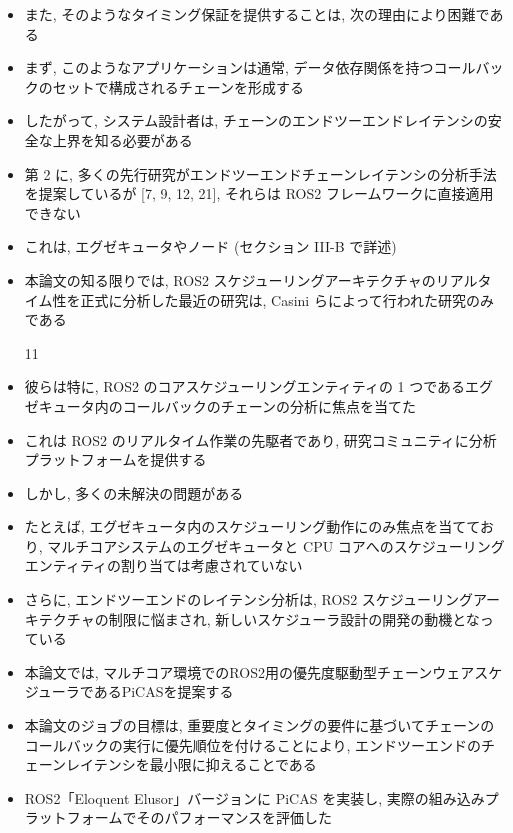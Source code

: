 \begin{frame}{}
    \begin{itemize}
        \item また, そのようなタイミング保証を提供することは, 次の理由により困難である
\item まず, このようなアプリケーションは通常, データ依存関係を持つコールバックのセットで構成されるチェーンを形成する
\item したがって, システム設計者は, チェーンのエンドツーエンドレイテンシの安全な上界を知る必要がある
\item 第 2 に, 多くの先行研究がエンドツーエンドチェーンレイテンシの分析手法を提案しているが [7, 9, 12, 21], それらは ROS2 フレームワークに直接適用できない
\item これは, エグゼキュータやノード (セクション III-B で詳述)
    \end{itemize}
\end{frame}

\begin{frame}{}
    \begin{itemize}
        \item 本論文の知る限りでは, ROS2 スケジューリングアーキテクチャのリアルタイム性を正式に分析した最近の研究は, Casini らによって行われた研究のみである
\item [11]
\item 彼らは特に, ROS2 のコアスケジューリングエンティティの 1 つであるエグゼキュータ内のコールバックのチェーンの分析に焦点を当てた
\item これは ROS2 のリアルタイム作業の先駆者であり, 研究コミュニティに分析プラットフォームを提供する
\item しかし, 多くの未解決の問題がある
\item たとえば, エグゼキュータ内のスケジューリング動作にのみ焦点を当てており, マルチコアシステムのエグゼキュータと CPU コアへのスケジューリングエンティティの割り当ては考慮されていない
\item さらに, エンドツーエンドのレイテンシ分析は, ROS2 スケジューリングアーキテクチャの制限に悩まされ, 新しいスケジューラ設計の開発の動機となっている
    \end{itemize}
\end{frame}

\begin{frame}{}
    \begin{itemize}
        \item 本論文では, マルチコア環境でのROS2用の優先度駆動型チェーンウェアスケジューラであるPiCASを提案する
\item 本論文のジョブの目標は, 重要度とタイミングの要件に基づいてチェーンのコールバックの実行に優先順位を付けることにより, エンドツーエンドのチェーンレイテンシを最小限に抑えることである
\item ROS2「Eloquent Elusor」バージョンに PiCAS を実装し, 実際の組み込みプラットフォームでそのパフォーマンスを評価した
    \end{itemize}
\end{frame}

